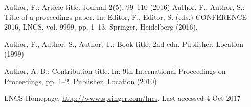 \documentclass[runningheads]{llncs}
\begin{document}
\begin{thebibliography}{8}
Author, F.: Article title. Journal \textbf{2}(5), 99--110 (2016)
Author, F., Author, S.: Title of a proceedings paper. In: Editor,
F., Editor, S. (eds.) CONFERENCE 2016, LNCS, vol. 9999, pp. 1--13.
Springer, Heidelberg (2016). 

Author, F., Author, S., Author, T.: Book title. 2nd edn. Publisher,
Location (1999)

Author, A.-B.: Contribution title. In: 9th International Proceedings
on Proceedings, pp. 1--2. Publisher, Location (2010)

LNCS Homepage, \url{http://www.springer.com/lncs}. Last accessed 4
Oct 2017
\end{thebibliography}
\end{document}
